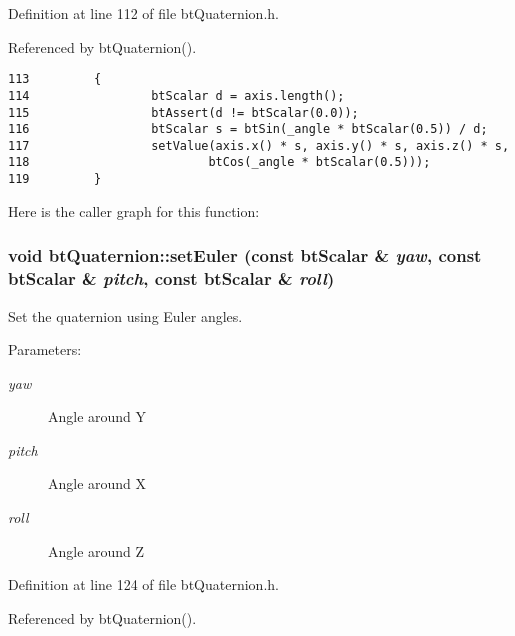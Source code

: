 Definition at line 112 of file btQuaternion.h.

Referenced by btQuaternion().

\begin{Code}\begin{verbatim}113         {
114                 btScalar d = axis.length();
115                 btAssert(d != btScalar(0.0));
116                 btScalar s = btSin(_angle * btScalar(0.5)) / d;
117                 setValue(axis.x() * s, axis.y() * s, axis.z() * s, 
118                         btCos(_angle * btScalar(0.5)));
119         }
\end{verbatim}
\end{Code}




Here is the caller graph for this function:\hypertarget{classbt_quaternion_ed0a6469d6c6c1e379f1143ad62b3439}{
\subsubsection[setEuler]{\setlength{\rightskip}{0pt plus 5cm}void btQuaternion::setEuler (const btScalar \& {\em yaw}, \/  const btScalar \& {\em pitch}, \/  const btScalar \& {\em roll})}}
\label{classbt_quaternion_ed0a6469d6c6c1e379f1143ad62b3439}


Set the quaternion using Euler angles. 

\begin{Desc}
\item[Parameters:]
\begin{description}
\item[{\em yaw}]Angle around Y \item[{\em pitch}]Angle around X \item[{\em roll}]Angle around Z \end{description}
\end{Desc}


Definition at line 124 of file btQuaternion.h.

Referenced by btQuaternion().

